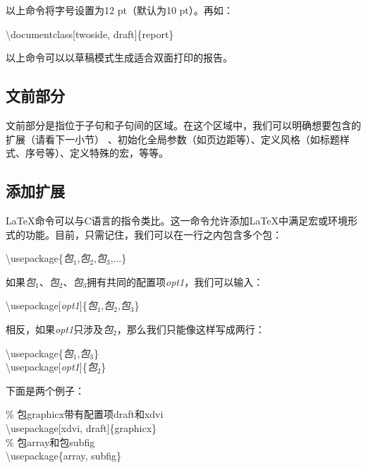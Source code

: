 以上命令将字号设置为12 pt（默认为10 pt）。再如：

\begin{dmd}
    \backslash documentclass[twoside, draft]\{report\}
\end{dmd}

以上命令可以以草稿模式生成适合双面打印的报告。

\subsection{文前部分}

文前部分是指位于子句和子句间的区域。在这个区域中，我们可以明确想要包含的扩展（请看下一小节）%
、初始化全局参数（如页边距等）、定义风格（如标题样式、序号等）、定义特殊的宏，等等。

\subsection{添加扩展}

\LaTeX 命令可以与C语言的指令类比。这一命令允许添加\LaTeX 中满足宏或环境形式的功能。目前，只需记住，我们可以在一行之内包含多个包：

\begin{dmd}
    \backslash usepackage\{\textsl{\<包$_1$\>},\textsl{\<包$_2$\>},\textsl{\<包$_3$\>},...\}
\end{dmd}

如果\textsl{\<包$_1$\>}、\textsl{\<包$_2$\>}、\textsl{\<包$_3$\>}拥有共同的配置项\textsl{\<opt1\>}，我们可以输入：

\begin{dmd}
    \backslash usepackage[\textsl{\<opt1\>}]\{\textsl{\<包$_1$\>},\textsl{\<包$_2$\>},\textsl{\<包$_3$\>}\}
\end{dmd}

相反，如果\textsl{\<opt1\>}只涉及\textsl{\<包$_2$\>}，那么我们只能像这样写成两行：

\begin{dmd}
    \backslash usepackage\{\textsl{\<包$_1$\>},\textsl{\<包$_3$\>}\}\\
    \backslash usepackage[\textsl{\<opt1\>}]\{\textsl{\<包$_2$\>}\}
\end{dmd}

下面是两个例子：

\begin{dmd}
    \% 包graphicx带有配置项draft和xdvi\\
    \backslash usepackage[xdvi, draft]\{graphicx\}\\
    \% 包array和包subfig\\
    \backslash usepackage\{array, subfig\}
\end{dmd}

